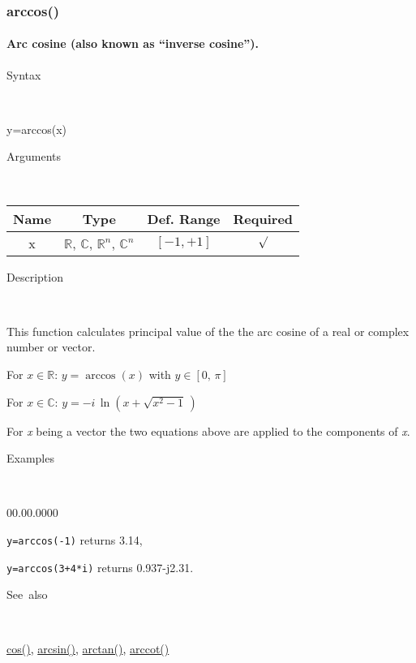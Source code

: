 \newpage
{}


\subsubsection*{\hypertarget{arccos}{}{\Large arccos()}}


\paragraph{\label{par:Arc-cosine}Arc cosine (also known as {}``inverse cosine'').}

\begin{description}
\item [Syntax]~
\end{description}
y=arccos(x)

\begin{description}
\item [Arguments]~
\end{description}
\begin{tabular}{|c|c|c|c|}
\hline 
Name&
Type&
Def. Range&
Required\tabularnewline
\hline
\hline 
x&
$\mathbb{R}$, $\mathbb{C}$, $\mathbb{R}^{n}$, $\mathbb{C}^{n}$&
$\left[-1,+1\right]$&
$\surd$\tabularnewline
\hline
\end{tabular}

\begin{description}
\item [Description]~
\end{description}
This function calculates principal value of the the arc cosine of
a real or complex number or vector.

\medskip{}
For $x\in\mathbb{R}$: $y=\arccos\left(x\right)$ with $y\in\left[0,\,\pi\right]$

\medskip{}
For $x\in\mathbb{C}$: $y=-i\,\ln\left(x+\sqrt{x^{2}-1}\,\right)$
\medskip{}

For \textit{x} being a vector the two equations above are
applied to the components of \textit{x}.

\begin{description}
\item [Examples]~
\end{description}
\begin{lyxlist}{00.00.0000}
\item [\texttt{y=arccos(-1)}]returns 3.14,
\item [\texttt{y=arccos(3+4{*}i)}]returns 0.937-j2.31.
\end{lyxlist}
\begin{description}
\item [See~also]~
\end{description}
\textcolor{blue}{\hyperlink{cos}{cos()}}\textcolor{black}{,} \textcolor{blue}{\hyperlink{arcsin}{arcsin()}}\textcolor{black}{,}
\textcolor{blue}{\hyperlink{arctan}{arctan()}}\textcolor{black}{,}
\textcolor{blue}{\hyperlink{arccot}{arccot()}}


